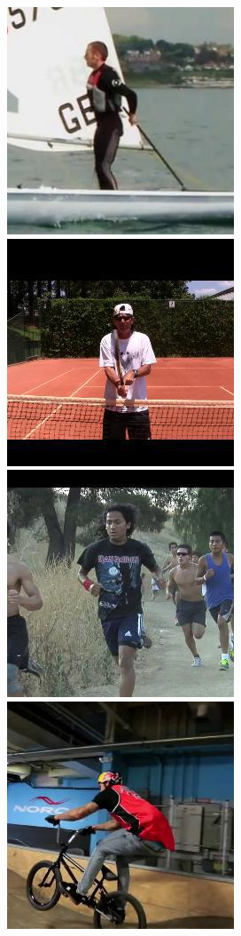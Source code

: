 \begin{figure}[t!]
    \hfill
    \includegraphics[height=\flowhh]{resources/Human_Poses/pose/qualitative/view/view_img_02}
    \hfill
    \includegraphics[height=\flowhh]{resources/Human_Poses/pose/qualitative/view/view_img_04}
    \hfill
    \includegraphics[height=\flowhh]{resources/Human_Poses/pose/qualitative/view/view_img_06}
    \hfill
    \includegraphics[height=\flowhh]{resources/Human_Poses/pose/qualitative/view/view_img_113}

\end{figure}
